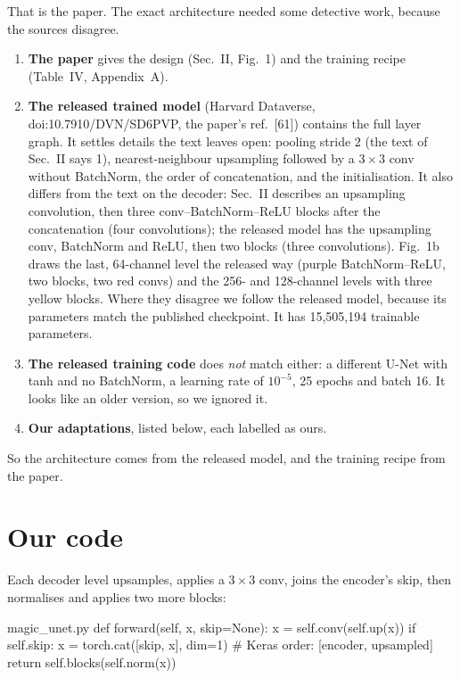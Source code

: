 That is the paper. The exact architecture needed some detective work, because the sources disagree.
\begin{enumerate}
\item \textbf{The paper} gives the design (Sec.~II, Fig.~1) and the training recipe (Table~IV, Appendix~A).
\item \textbf{The released trained model} (Harvard Dataverse, doi:10.7910/DVN/SD6PVP, the paper's ref.~[61]) contains the
full layer graph. It settles details the text leaves open: pooling stride 2 (the text of Sec.~II says 1), nearest-neighbour
upsampling followed by a $3\times3$ conv without BatchNorm, the order of concatenation, and the initialisation. It also
differs from the text on the decoder: Sec.~II describes an upsampling convolution, then three conv--BatchNorm--ReLU
blocks after the concatenation (four convolutions); the released model has the upsampling conv, BatchNorm and ReLU, then
two blocks (three convolutions). Fig.~1b draws the last, 64-channel level the released way (purple BatchNorm--ReLU, two
blocks, two red convs) and the 256- and 128-channel levels with three yellow blocks. Where they disagree we follow the
released model, because its parameters match the published checkpoint. It has 15,505,194 trainable parameters.
\item \textbf{The released training code} does \emph{not} match either: a different U-Net with tanh and no BatchNorm, a
learning rate of $10^{-5}$, 25 epochs and batch 16. It looks like an older version, so we ignored it.
\item \textbf{Our adaptations}, listed below, each labelled as ours.
\end{enumerate}
So the architecture comes from the released model, and the training recipe from the paper.

\section{Our code}

Each decoder level upsamples, applies a $3\times3$ conv, joins the encoder's skip, then normalises and applies two more
blocks:

\begin{code*}{magic_unet.py}
    def forward(self, x, skip=None):
        x = self.conv(self.up(x))
        if self.skip:
            x = torch.cat([skip, x], dim=1)     # Keras order: [encoder, upsampled]
        return self.blocks(self.norm(x))
\end{code*}

